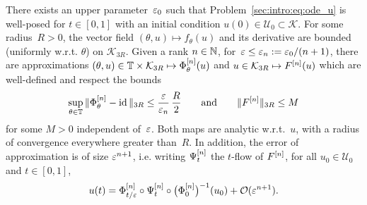 \begin{assumption} \label{hyp:exist_avg_nl} %
  There exists an upper parameter~$\varepsilon_0$ such that
  Problem~\eqref{sec:intro:eq:ode_u} is well-posed for $t \in [0,1]$
  with an initial condition $u(0) \in \mathcal{U}_0 \subset
  \mathcal{K}$. For some radius~$R > 0$, the vector field $(\theta ,
  u) \mapsto f_\theta(u)$ and its derivative are bounded (uniformly
  w.r.t. $\theta$) on $\mathcal{K}_{3R}$. Given a rank $n \in \mathbb{N}$,
  for~$\varepsilon \leq \varepsilon_n := \varepsilon_0 / (n+1)$, there are approximations
  $(\theta, u) \in \mathbb{T} \times \mathcal{K}_{3R} \mapsto \Phi^{[n]}_\theta
  (u)$ and $u \in \mathcal{K}_{3R} \mapsto F^{[n]} (u)$ which are
  well-defined and respect the bounds
  \begin{equation*}
    \sup_{\theta \in \mathbb{T}} \| \Phi^{[n]}_\theta - \operatorname{id} \| _{3R} 
      \leq \frac{\varepsilon}{\varepsilon_n}\, \frac R 2
    \qquad\text{and}\qquad
    \| F^{[n]} \|_{3R} \leq M 
  \end{equation*}
  for some $M > 0$ independent of~$\varepsilon$. Both maps are analytic
  w.r.t.~$u$, with a radius of convergence everywhere greater than~$R$.
  In addition, the error of approximation is of size $\varepsilon^{n+1}$, i.e.
  writing $\Psi^{[n]} _t$ the $t$-flow of $F^{[n]}$, for all $u_0 \in
  \mathcal{U}_0$ and $t \in [0,1]$, 
  \begin{equation} \label{sec:approx:def:avg_approx}
    u(t) = \Phi^{[n]} _{t/\varepsilon} \circ \Psi^{[n]} _t \circ \big( \Phi^{[n]} _0
    \big)^{-1} (u_0) + \mathcal{O}(\varepsilon^{n+1}) .
  \end{equation}
\end{assumption}

